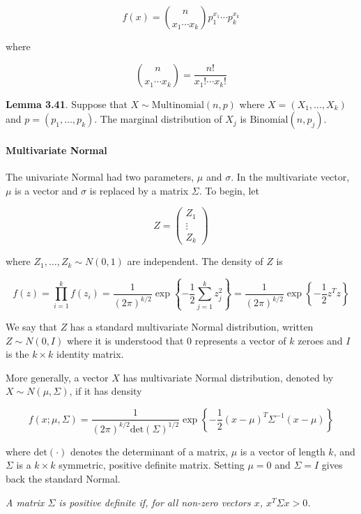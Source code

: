 \[ f(x) = \binom{n}{x_1 \cdots x_k} p_1^{x_1} \cdots p_k^{x_k} \]

where

\[ \binom{n}{x_1 \cdots x_k} = \frac{n!}{x_1! \cdots x_k!} \]

\textbf{Lemma 3.41}. Suppose that \(X \sim \text{Multinomial}(n, p)\)
where \(X = (X_1, \dots, X_k)\) and \(p = (p_1, \dots, p_k)\). The
marginal distribution of \(X_j\) is \(\text{Binomial}(n, p_j)\).

\paragraph{Multivariate Normal}\label{multivariate-normal}

The univariate Normal had two parameters, \(\mu\) and \(\sigma\). In the
multivariate vector, \(\mu\) is a vector and \(\sigma\) is replaced by a
matrix \(\Sigma\). To begin, let

\[ Z = \begin{pmatrix}
Z_1 \\
\vdots \\
Z_k
\end{pmatrix}\]

where \(Z_1, \dots, Z_k \sim N(0, 1)\) are independent. The density of
\(Z\) is

\[ f(z) = \prod_{i=1}^k f(z_i) 
= \frac{1}{(2 \pi)^{k/2}} \exp \left\{ -\frac{1}{2} \sum_{j=1}^k z_j^2 \right\} 
= \frac{1}{(2 \pi)^{k/2}} \exp \left\{ -\frac{1}{2} z^T z \right\} 
\]

We say that \(Z\) has a standard multivariate Normal distribution,
written \(Z \sim N(0, I)\) where it is understood that \(0\) represents
a vector of \(k\) zeroes and \(I\) is the \(k \times k\) identity
matrix.

More generally, a vector \(X\) has multivariate Normal distribution,
denoted by \(X \sim N(\mu, \Sigma)\), if it has density

\[ f(x; \mu, \Sigma) = \frac{1}{(2 \pi)^{k/2} \text{det}(\Sigma)^{1/2}} \exp \left\{ - \frac{1}{2} (x - \mu)^T \Sigma^{-1} (x - \mu) \right\} \]

where \(\text{det}(\cdot)\) denotes the determinant of a matrix, \(\mu\)
is a vector of length \(k\), and \(\Sigma\) is a \(k \times k\)
symmetric, positive definite matrix. Setting \(\mu = 0\) and
\(\Sigma = I\) gives back the standard Normal.

\emph{A matrix \(\Sigma\) is positive definite if, for all non-zero
vectors \(x\), \(x^T \Sigma x > 0\).}

